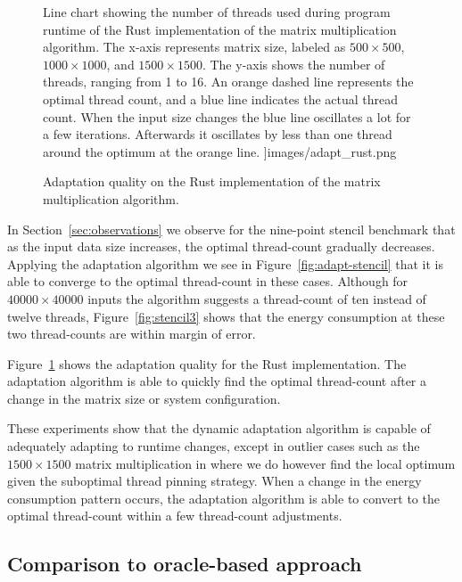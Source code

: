 \begin{figure}[t]
\begin{minipage}[c]{0.49\linewidth}
{            Line chart showing the number of threads used during program runtime of the Rust
            implementation of the matrix multiplication algorithm. The x-axis represents matrix
            size, labeled as $500 \times 500$, $1000 \times 1000$, and $1500 \times 1500$. The
            y-axis shows the number of threads, ranging from 1 to 16. An orange dashed line
            represents the optimal thread count, and a blue line indicates the actual thread count.
            When the input size changes the blue line oscillates a lot for a few iterations.
            Afterwards it oscillates by less than one thread around the optimum at the orange line.
        }]{images/adapt_rust.png}
        \caption{Adaptation quality on the Rust implementation of the matrix multiplication algorithm.}
        \label{fig:adapt-rust}
    \end{minipage}%
\end{figure}

In Section~\ref{sec:observations} we observe for the nine-point stencil benchmark that as the input
data size increases, the optimal thread-count gradually decreases. Applying the adaptation algorithm
we see in Figure~\ref{fig:adapt-stencil} that it is able to converge to the optimal thread-count in
these cases. Although for $40000 \times 40000$ inputs the algorithm suggests a thread-count of ten
instead of twelve threads, Figure~\ref{fig:stencil3} shows that the energy consumption at these two
thread-counts are within margin of error.

Figure~\ref{fig:adapt-rust} shows the adaptation quality for the Rust implementation. The adaptation
algorithm is able to quickly find the optimal thread-count after a change in the matrix size or
system configuration.

These experiments show that the dynamic adaptation algorithm is capable of adequately adapting to
runtime changes, except in outlier cases such as the $1500 \times 1500$ matrix multiplication in
\sac{} where we do however find the local optimum given the suboptimal thread pinning strategy. When
a change in the energy consumption pattern occurs, the adaptation algorithm is able to convert to
the optimal thread-count within a few thread-count adjustments.

\subsection{Comparison to oracle-based approach}\label{sec:evalation-oracle}

